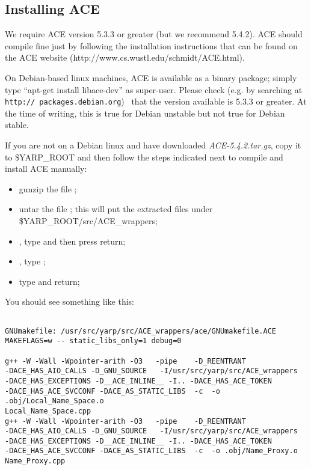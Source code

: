 \subsection{Installing ACE}
We require ACE version 5.3.3 or greater (but we recommend 5.4.2). ACE should compile fine just by following the installation instructions that can be found on the ACE website (http://www.cs.wustl.edu/schmidt/ACE.html). 

On Debian-based linux machines, ACE is available as a binary package; simply type ``apt-get install libace-dev'' as super-user.  Please check (e.g. by searching at {\tt http:// packages.debian.org}) ~that the version available is 5.3.3 or greater.  At the time of writing, this is true for Debian unstable but not true for Debian stable.

If you are not on a Debian linux and have downloaded {\em ACE-5.4.2.tar.gz}, copy it to \$YARP\_ROOT and then follow the steps indicated next to compile and install ACE manually:
\begin{itemize}
\item gunzip the file ;
\item untar the file ; this will put the extracted files under \$YARP\_ROOT/src/ACE\_wrappers;
\item {}, type  and then press return;
\item {}, type ;
\item type  and return;
\end{itemize}

You should see something like this:
\begin{verbatim}

GNUmakefile: /usr/src/yarp/src/ACE_wrappers/ace/GNUmakefile.ACE 
MAKEFLAGS=w -- static_libs_only=1 debug=0

g++ -W -Wall -Wpointer-arith -O3   -pipe    -D_REENTRANT 
-DACE_HAS_AIO_CALLS -D_GNU_SOURCE   -I/usr/src/yarp/src/ACE_wrappers 
-DACE_HAS_EXCEPTIONS -D__ACE_INLINE__ -I.. -DACE_HAS_ACE_TOKEN 
-DACE_HAS_ACE_SVCCONF -DACE_AS_STATIC_LIBS  -c  -o .obj/Local_Name_Space.o
Local_Name_Space.cpp
g++ -W -Wall -Wpointer-arith -O3   -pipe    -D_REENTRANT 
-DACE_HAS_AIO_CALLS -D_GNU_SOURCE   -I/usr/src/yarp/src/ACE_wrappers 
-DACE_HAS_EXCEPTIONS -D__ACE_INLINE__ -I.. -DACE_HAS_ACE_TOKEN 
-DACE_HAS_ACE_SVCCONF -DACE_AS_STATIC_LIBS  -c  -o .obj/Name_Proxy.o 
Name_Proxy.cpp

\end{verbatim}

